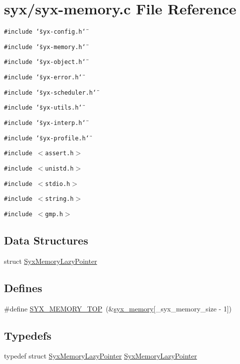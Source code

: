 \hypertarget{syx-memory_8c}{
\section{syx/syx-memory.c File Reference}
\label{syx-memory_8c}
}
{\tt \#include \char`\"{}syx-config.h\char`\"{}}\par
{\tt \#include \char`\"{}syx-memory.h\char`\"{}}\par
{\tt \#include \char`\"{}syx-object.h\char`\"{}}\par
{\tt \#include \char`\"{}syx-error.h\char`\"{}}\par
{\tt \#include \char`\"{}syx-scheduler.h\char`\"{}}\par
{\tt \#include \char`\"{}syx-utils.h\char`\"{}}\par
{\tt \#include \char`\"{}syx-interp.h\char`\"{}}\par
{\tt \#include \char`\"{}syx-profile.h\char`\"{}}\par
{\tt \#include $<$assert.h$>$}\par
{\tt \#include $<$unistd.h$>$}\par
{\tt \#include $<$stdio.h$>$}\par
{\tt \#include $<$string.h$>$}\par
{\tt \#include $<$gmp.h$>$}\par
\subsection*{Data Structures}
\begin{CompactItemize}
\item 
struct \hyperlink{struct_syx_memory_lazy_pointer}{SyxMemoryLazyPointer}
\end{CompactItemize}
\subsection*{Defines}
\begin{CompactItemize}
\item 
\#define \hyperlink{syx-memory_8c_37057b4e55064ea756bd4713d9b9d3b2}{SYX\_\-MEMORY\_\-TOP}~(\&\hyperlink{syx-object_8h_596eb1af08585a501808735d80503037}{syx\_\-memory}\mbox{[}\_\-syx\_\-memory\_\-size - 1\mbox{]})
\end{CompactItemize}
\subsection*{Typedefs}
\begin{CompactItemize}
\item 
typedef struct \hyperlink{struct_syx_memory_lazy_pointer}{SyxMemoryLazyPointer} \hyperlink{syx-memory_8c_02d5517a6ca46e6109ab7065d4836c3e}{SyxMemoryLazyPointer}
\end{CompactItemize}
